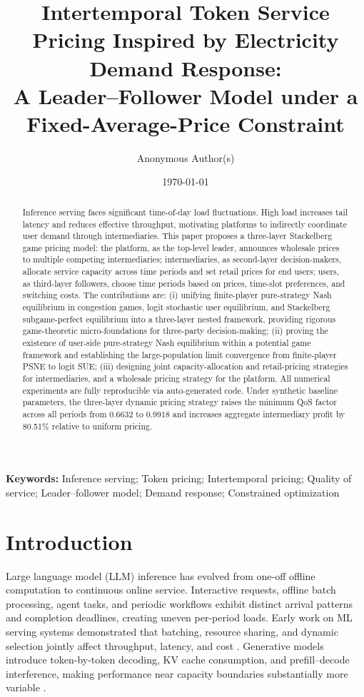 \documentclass[11pt]{article}
\title{\textbf{Intertemporal Token Service Pricing Inspired by Electricity Demand Response:\\[4pt]
A Leader--Follower Model under a Fixed-Average-Price Constraint}}
\author{Anonymous Author(s)}
\date{\today}
\begin{document}
\maketitle

\begin{abstract}
Inference serving faces significant time-of-day load fluctuations. High load
increases tail latency and reduces effective throughput, motivating platforms
to indirectly coordinate user demand through intermediaries. This paper
proposes a three-layer Stackelberg game pricing model: the platform, as the
top-level leader, announces wholesale prices to multiple competing
intermediaries; intermediaries, as second-layer decision-makers, allocate
service capacity across time periods and set retail prices for end users;
users, as third-layer followers, choose time periods based on prices,
time-slot preferences, and switching costs. The contributions are:
(i) unifying finite-player pure-strategy Nash equilibrium in congestion
games, logit stochastic user equilibrium, and Stackelberg subgame-perfect
equilibrium into a three-layer nested framework, providing rigorous
game-theoretic micro-foundations for three-party decision-making;
(ii) proving the existence of user-side pure-strategy Nash equilibrium
within a potential game framework and establishing the large-population
limit convergence from finite-player PSNE to logit SUE;
(iii) designing joint capacity-allocation and retail-pricing strategies
for intermediaries, and a wholesale pricing strategy for the platform.
All numerical experiments are fully reproducible via auto-generated code.
Under synthetic baseline parameters, the three-layer dynamic pricing
strategy raises the minimum QoS factor across all periods from 0.6632
to 0.9918 and increases aggregate intermediary profit by 80.51\%
relative to uniform pricing.
\end{abstract}

\noindent\textbf{Keywords:} Inference serving; Token pricing; Intertemporal pricing;
Quality of service; Leader--follower model; Demand response; Constrained
optimization

\section{Introduction}

Large language model (LLM) inference has evolved from one-off offline computation to
continuous online service. Interactive requests, offline batch processing, agent
tasks, and periodic workflows exhibit distinct arrival patterns and completion
deadlines, creating uneven per-period loads. Early work on ML serving systems
demonstrated that batching, resource sharing, and dynamic selection jointly affect
throughput, latency, and cost
\cite{crankshaw2017clipper,gujarati2020clockwork,romero2021infaas}.
Generative models introduce token-by-token decoding, KV cache consumption, and
prefill--decode interference, making performance near capacity boundaries
substantially more variable
\cite{yu2022orca,kwon2023pagedattention,agrawal2024sarathiserve}.
\end{document}

